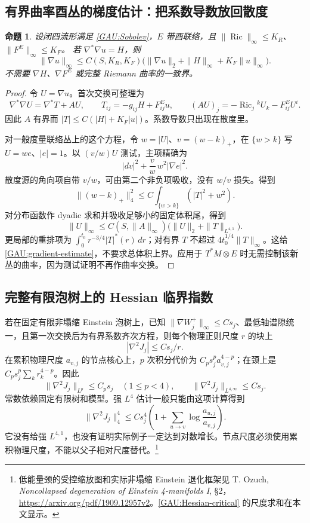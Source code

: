 \documentclass[UTF8,fontset=fandol,zihao=-4,oneside,openany]{ctexbook}
\theoremstyle{cjkplain}
\newtheorem{proposition}[theorem]{命题}
\numberwithin{equation}{chapter}
\begin{document}
\subsection{有界曲率酉丛的梯度估计：把系数导数放回散度}
\begin{proposition}\label{GAU:bundle-gradient}
设闭四流形满足 \eqref{GAU:Sobolev}，$E$ 带酉联络，且
$\|\operatorname{Ric}\|_\infty\le K_R$、$\|F^E\|_\infty\le K_F$。
若 $\nabla^*\nabla u=H$，则
\begin{equation}\label{GAU:gradient-estimate}
\|\nabla u\|_\infty\le C(S,K_R,K_F)
\bigl(\|\nabla u\|_2+\|H\|_\infty+K_F\|u\|_\infty\bigr).
\end{equation}
不需要 $\nabla H$、$\nabla F^E$ 或完整 Riemann 曲率的一致界。
\end{proposition}
\begin{proof}
令 $U=\nabla u$。首次交换可整理为
\[
\nabla^*\nabla U=\nabla^*T+AU,
\qquad T_{ij}=-g_{ij}H+F^E_{ij}u,
\qquad (AU)_j=-\operatorname{Ric}_j{}^kU_k-F^E_{ij}U^i.
\]
因此 $A$ 有界而 $|T|\le C(|H|+K_F|u|)$。系数导数只出现在散度里。

对一般度量联络丛上的这个方程，令 $w=|U|$、$v=(w-k)_+$，在 $\{w>k\}$ 写 $U=we$、$|e|=1$。以 $(v/w)U$ 测试，主项精确为
\[
|dv|^2+\frac vw\,w^2|\nabla e|^2.
\]
散度源的角向项自带 $v/w$，可由第二个非负项吸收，没有 $w/v$ 损失。得到
\[
\|(w-k)_+\|_4^2\le C\int_{\{w>k\}}(|T|^2+w^2).
\]
对分布函数作 dyadic 求和并吸收足够小的固定体积尾，得到
\begin{equation}\label{GAU:divergence-Lorentz}
\|U\|_\infty\le C(S,\|A\|_\infty)
\bigl(\|U\|_2+\|T\|_{L^{4,1}}\bigr).
\end{equation}
更局部的重排项为 $\int_0^{t_0}r^{-3/4}|T|^*(r)\,dr$；对有界 $T$ 不超过 $4t_0^{1/4}\|T\|_\infty$。这给 \eqref{GAU:gradient-estimate}，不要求总体积上界。应用于 $T^*M\otimes E$ 时无需控制该新丛的曲率，因为测试证明不再作曲率交换。
\end{proof}

\subsection{完整有限泡树上的 Hessian 临界指数}
若在固定有限非塌缩 Einstein 泡树上，已知
$\|\nabla W_j^+\|_\infty\le Cs_j$、最低轴谱隙统一，且第一次交换后为有界系数齐次方程，则每个物理正则尺度 $r$ 的块上
\[
|\nabla^2J_j|\le C s_j/r.
\]
在累积物理尺度 $a_{v,j}$ 的节点核心上，$p$ 次积分代价为
$C_ps_j^pa_{v,j}^{4-p}$；在颈上是
$C_ps_j^p\sum_k r_k^{4-p}$。因此
\begin{equation}\label{GAU:Hessian-critical}
\|\nabla^2J_j\|_{L^p}\le C_ps_j\quad(1\le p<4),
\qquad \|\nabla^2J_j\|_{L^{4,\infty}}\le Cs_j.
\end{equation}
常数依赖固定有限树和模型。强 $L^4$ 估计一般只能由这项计算得到
\[
\|\nabla^2J_j\|_4^4\le Cs_j^4
\left(1+\sum_{u\to v}\log\frac{a_{u,j}}{a_{v,j}}\right).
\]
它没有给强 $L^{4,1}$，也没有证明实际例子一定达到对数增长。节点尺度必须使用累积物理尺度，不能以父子相对尺度替代。\footnote{低能量颈的受控缩放图和实际非塌缩 Einstein 退化框架见 T. Ozuch, \emph{Noncollapsed degeneration of Einstein 4-manifolds I}, §2，\url{https://arxiv.org/pdf/1909.12957v2}。\eqref{GAU:Hessian-critical} 的尺度求和在本文显示。}
\end{document}
